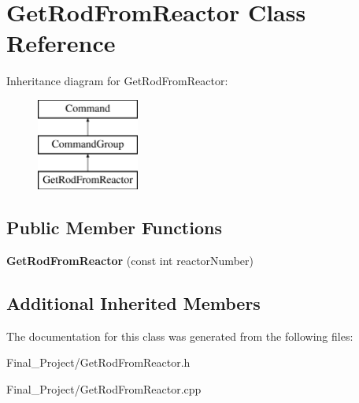 \hypertarget{classGetRodFromReactor}{\section{Get\-Rod\-From\-Reactor Class Reference}
\label{classGetRodFromReactor}
}
Inheritance diagram for Get\-Rod\-From\-Reactor\-:\begin{figure}[H]
\begin{center}
\leavevmode
\includegraphics[height=3.000000cm]{classGetRodFromReactor}
\end{center}
\end{figure}
\subsection*{Public Member Functions}
\begin{DoxyCompactItemize}
\item 
\hypertarget{classGetRodFromReactor_ae6432d3e1fd6ca0e882d9cbff1b14737}{{\bfseries Get\-Rod\-From\-Reactor} (const int reactor\-Number)}\label{classGetRodFromReactor_ae6432d3e1fd6ca0e882d9cbff1b14737}

\end{DoxyCompactItemize}
\subsection*{Additional Inherited Members}


The documentation for this class was generated from the following files\-:\begin{DoxyCompactItemize}
\item 
Final\-\_\-\-Project/Get\-Rod\-From\-Reactor.\-h\item 
Final\-\_\-\-Project/Get\-Rod\-From\-Reactor.\-cpp\end{DoxyCompactItemize}
